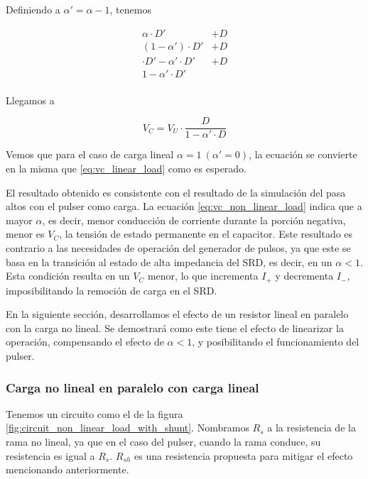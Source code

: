 Definiendo a $\alpha'=\alpha-1$, tenemos

\begin{equation}
    \label{eq:vc_non_linear_load}
    \begin{aligned}
        \alpha \cdot D' &+ D \\
        (1-\alpha') \cdot D' &+ D \\
        \cdot D' - \alpha' \cdot D' &+ D \\
        1 - \alpha' \cdot D' & \\
    \end{aligned}
\end{equation}

Llegamos a

\begin{equation}
    \label{eq:vc_non_linear_load_final}
        V_C = V_U \cdot \frac{D}{1-\alpha' \cdot D}
\end{equation}

Vemos que para el caso de carga lineal $\alpha = 1 \ (\alpha'=0)$, la ecuación
se convierte en la misma que \ref{eq:vc_linear_load} como es esperado.

El resultado obtenido es consistente con el resultado de la simulación del pasa
altos con el pulser como carga. La ecuación
\ref{eq:vc_non_linear_load}  indica que a mayor $\alpha$, es decir, menor
conducción de corriente durante la porción negativa, menor es $V_C$, la tensión de
estado permanente en el capacitor. Este resultado es contrario a las necesidades
de operación del generador de pulsos, ya que este se basa en la transición al
estado de alta impedancia del SRD, es decir, en un $\alpha < 1$. Esta condición
resulta en un $V_C$ menor, lo que incrementa $I_+$ y decrementa $I_-$,
imposibilitando la remoción de carga en el SRD.

En la siguiente sección, desarrollamos el efecto de un resistor lineal en
paralelo con la carga no lineal. Se demostrará como este tiene el efecto de
linearizar la operación, compensando el efecto de $\alpha < 1$, y posibilitando
el funcionamiento del pulser.

\subsubsection{Carga no lineal en paralelo con carga lineal}

Tenemos un circuito como el de la figura
\ref{fig:circuit_non_linear_load_with_shunt}. Nombramos $R_s$ a la resistencia
de la rama no lineal, ya que en el caso del pulser, cuando la rama conduce, su
resistencia es igual a $R_s$. $R_{sh}$ es una resistencia propuesta para mitigar
el efecto mencionando anteriormente.

